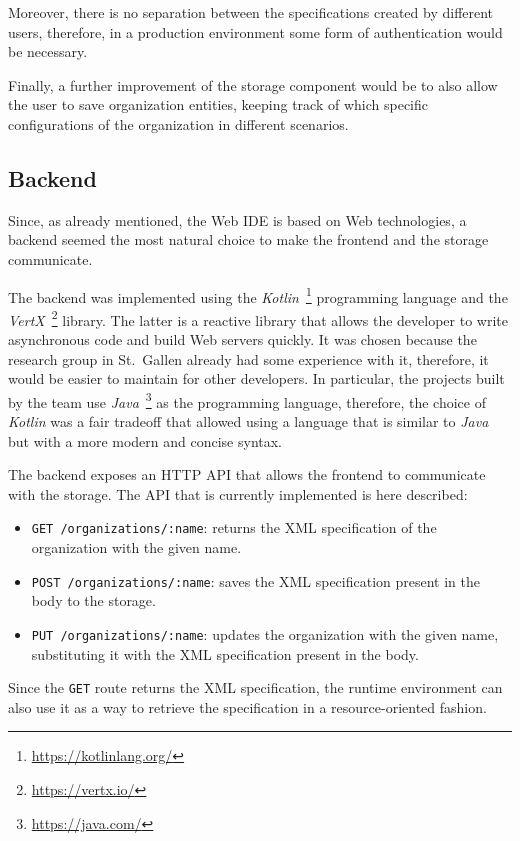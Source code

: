 Moreover, there is no separation between the specifications created by different users, therefore, in a production environment some form of authentication would be necessary.

Finally, a further improvement of the storage component would be to also allow the user to save organization entities, keeping track of which specific configurations of the organization in different scenarios.

\subsection{Backend}
Since, as already mentioned, the Web IDE is based on Web technologies, a backend seemed the most natural choice to make the frontend and the storage communicate.

The backend was implemented using the \textit{Kotlin}~\footnote{\url{https://kotlinlang.org/}} programming language and the \textit{VertX}~\footnote{\url{https://vertx.io/}} library.
The latter is a reactive library that allows the developer to write asynchronous code and build Web servers quickly.
It was chosen because the research group in St.\ Gallen already had some experience with it, therefore, it would be easier to maintain for other developers.
In particular, the projects built by the team use \textit{Java}~\footnote{\url{https://java.com/}} as the programming language, therefore, the choice of \textit{Kotlin} was a fair tradeoff that allowed using a language that is similar to \textit{Java} but with a more modern and concise syntax.

The backend exposes an HTTP API that allows the frontend to communicate with the storage.
The API that is currently implemented is here described:
\begin{itemize}
    \item \texttt{GET /organizations/:name}: returns the XML specification of the organization with the given name.
    \item \texttt{POST /organizations/:name}: saves the XML specification present in the body to the storage.
    \item \texttt{PUT /organizations/:name}: updates the organization with the given name, substituting it with the XML specification present in the body.
\end{itemize}
Since the \texttt{GET} route returns the XML specification, the runtime environment can also use it as a way to retrieve the specification in a resource-oriented fashion.

